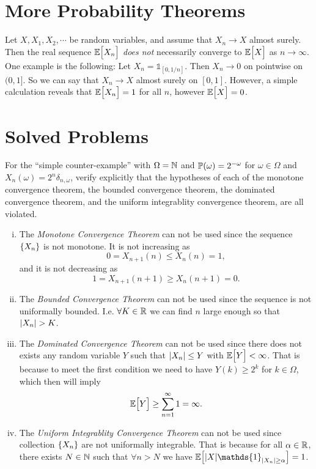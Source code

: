 \section{More Probability Theorems}

\begin{observation}
	Let $ X,X_1,X_2,\cdots $ be random variables, and assume that $ X_n\to X $ almost surely. Then the real sequence $ \mathbb{E}\big[X_n\big] $ \emph{does not} necessarily converge to $ \mathbb{E}\big[X\big] $ as $ n\to \infty $. One example is the following: Let $ X_n = \mathds{1}_{[0,1/n]} $. Then $ X_n\to 0 $ on pointwise on $ (0,1] $. So we can say that $ X_n\to  X $ almost surely on $ [0,1] $. However, a simple calculation reveals that $ \mathbb{E}\big[X_n\big] = 1 $ for all $ n $, however $ \mathbb{E}\big[X\big] = 0 $. 
\end{observation}



\section{Solved Problems}

\begin{problem}
	For the ``simple counter-example'' with $ \Omega = \mathbb{N} $ and $ \mathbb{P}(\omega) = 2^{-\omega} $ for $ \omega \in \Omega $ and $ X_n(\omega) = 2^n\delta_{n,\omega} $, verify explicitly that the hypotheses of each of the monotone convergence theorem, the bounded convergence theorem, the dominated convergence theorem, and the uniform integrablity convergence theorem, are all violated.
\end{problem}
\begin{solution}
	\begin{enumerate}[(i)]
		\item The \emph{Monotone Convergence Theorem} can not be used since the sequence $ \{X_n\} $ is not monotone. It is not increasing as
		\[ 0=X_{n+1}(n)\leq X_{n}(n) = 1, \]
		and it is not decreasing as
		\[ 1=X_{n+1}(n+1)\geq X_n(n+1) = 0. \]
		\item The \emph{Bounded Convergence Theorem} can not be used since the sequence is not uniformally bounded. I.e. $ \forall K \in \mathbb{R} $ we can find $ n $ large enough so that $ |X_n| > K $.
		\item The \emph{Dominated Convergence Theorem} can not be used since there does not exists any random variable $ Y $ such that $ |X_n|\leq Y $ with $ \mathbb{E}\big[Y\big]<\infty $. That is because to meet the first condition we need to have $ Y(k)\geq 2^k $ for $ k\in\Omega  $, which then will imply
		\[ \mathbb{E}\big[Y\big] \geq \sum_{n=1}^\infty 1 = \infty. \]
		\item The \emph{Uniform Integrablity Convergence Theorem} can not be used since collection $ \{X_n\} $ are not uniformally integrable. That is because for all $ \alpha\in \mathbb{R} $, there exists $ N\in \mathbb{N} $ such that $ \forall n>N $ we have $ \E{\abs{X}\mathds{1}_{\abs{X_n}\geq\alpha}} = 1 $.
	\end{enumerate}
\end{solution}


